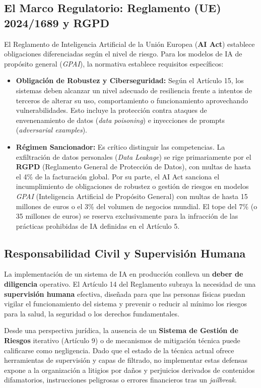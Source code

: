 \documentclass[12pt]{article}
\begin{document}
\subsection{El Marco Regulatorio: Reglamento (UE) 2024/1689 y RGPD}
El Reglamento de Inteligencia Artificial de la Unión Europea (\textbf{AI Act}) \parencite{eu2024aiact} establece obligaciones diferenciadas según el nivel de riesgo. Para los modelos de IA de propósito general (\textit{GPAI}), la normativa establece requisitos específicos:
\begin{itemize}
    \item \textbf{Obligación de Robustez y Ciberseguridad:} Según el Artículo 15, los sistemas deben alcanzar un nivel adecuado de resiliencia frente a intentos de terceros de alterar su uso, comportamiento o funcionamiento aprovechando vulnerabilidades. Esto incluye la protección contra ataques de envenenamiento de datos (\textit{data poisoning}) e inyecciones de prompts (\textit{adversarial examples}).
\item \textbf{Régimen Sancionador:} Es crítico distinguir las competencias. La exfiltración de datos personales (\textit{Data Leakage}) se rige primariamente por el \textbf{RGPD} (Reglamento General de Protección de Datos), con multas de hasta el 4\% de la facturación global. Por su parte, el AI Act sanciona el incumplimiento de obligaciones de robustez o gestión de riesgos en modelos \textit{GPAI} (Inteligencia Artificial de Propósito General) con multas de hasta 15 millones de euros o el 3\% del volumen de negocios mundial. El tope del 7\% (o 35 millones de euros) se reserva exclusivamente para la infracción de las prácticas prohibidas de IA definidas en el Artículo 5.
\end{itemize}

\subsection{Responsabilidad Civil y Supervisión Humana}
La implementación de un sistema de IA en producción conlleva un \textbf{deber de diligencia} operativo. El Artículo 14 del Reglamento subraya la necesidad de una \textbf{supervisión humana} efectiva, diseñada para que las personas físicas puedan vigilar el funcionamiento del sistema y prevenir o reducir al mínimo los riesgos para la salud, la seguridad o los derechos fundamentales.

Desde una perspectiva jurídica, la ausencia de un \textbf{Sistema de Gestión de Riesgos} iterativo (Artículo 9) o de mecanismos de mitigación técnica puede calificarse como negligencia. Dado que el estado de la técnica actual ofrece herramientas de supervisión y capas de filtrado, no implementar estas defensas expone a la organización a litigios por daños y perjuicios derivados de contenidos difamatorios, instrucciones peligrosas o errores financieros tras un \textit{jailbreak}.
\end{document}
